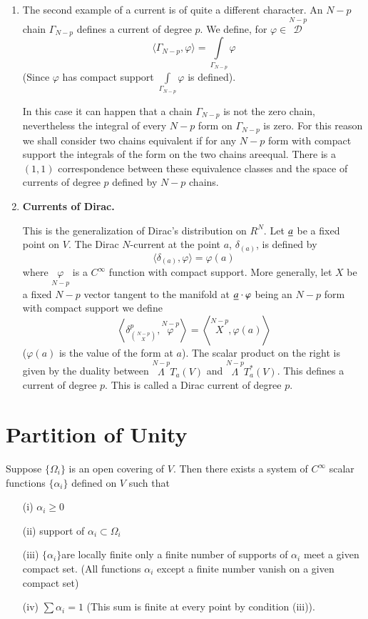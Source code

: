 \begin{enumerate}
\item The second example of a current is of quite a different
  character. An $N-p$ chain $\Gamma_{N-p}$ defines a current of degree
  $p$. We define, for $\varphi\in\overset{N-p}{\mathscr{D}}$
$$
\langle \Gamma_{N-p},\varphi\rangle=\int\limits_{\Gamma_{N-p}}\varphi
$$
(Since $\varphi$ has compact support
$\int\limits_{\Gamma_{N-p}}\varphi$ is defined).

In this case it can happen that a chain $\Gamma_{N-p}$ is not the zero
chain, nevertheless the integral of every $N-p$ form on $\Gamma_{N-p}$
is zero. For this reason we shall consider two chains equivalent if
for any $N-p$ form with compact support the integrals of the form on
the two chains are\pageoriginale equal. There is a $(1,1)$
correspondence between these equivalence classes and the space of
currents of degree $p$ defined by $N-p$ chains.

\item {\bf Currents of Dirac.}

This is the generalization of Dirac's distribution on $R^{N}$. Let
$\underline{a}$ be a fixed point on $V$. The Dirac $N$-current at the point
$a$, $\delta_{(a)}$, is defined by
$$
\langle \delta_{(a)},\varphi\rangle=\varphi(a)
$$
where $\underset{N-p}{\varphi}$ is a $C^{\infty}$ function with
compact support. More generally, let $X$ be a fixed $N-p$ vector
tangent to the manifold at $\underline{a}\cdot \varphi$ being an $N-p$ form
with compact support we define
$$
\left\langle \delta^{p}_{\binom{N-p}{X}},
\overset{N-p}{\varphi}\right\rangle = \left\langle
\overset{N-p}{X}, \varphi(a)\right\rangle
$$
($\varphi(a)$ is the value of the form at $a$). The scalar product on
the right is given by the duality between
$\overset{N-p}{\Lambda}T_{a}(V)$ and
$\overset{N-p}{\Lambda}T^{\ast}_{a}(V)$. This defines a current of
degree $p$. This is called a Dirac current of degree $p$.
\end{enumerate}

\section*{Partition of Unity}

Suppose $\{\Omega_{i}\}$ is an open covering of $V$. Then there exists
a system of $C^{\infty}$ scalar functions $\{\alpha_{i}\}$ defined on
$V$ such that
\begin{itemize}
\item[(i)] $\alpha_{i}\geq 0$

\item[(ii)] support of $\alpha_{i}\subset \Omega_{i}$

\item[(iii)] $\{\alpha_{i}\}$\pageoriginale are locally finite \iec
  only a finite number of supports of $\alpha_{i}$ meet a given
  compact set. (All functions $\alpha_{i}$ except a finite number
  vanish on a given compact set)

\item[(iv)] $\sum \alpha_{i}=1$ (This sum is finite at every point by
  condition (iii)).
\end{itemize}

